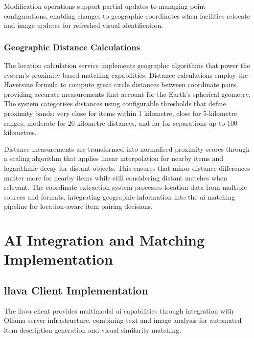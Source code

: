 Modification operations support partial updates to managing point configurations, enabling changes to geographic coordinates when facilities relocate and image updates for refreshed visual identification.

\subsubsection{Geographic Distance Calculations}

The location calculation service implements geographic algorithms that power the system's proximity-based matching capabilities. Distance calculations employ the Haversine formula \cite{Sinnott1984} to compute great circle distances between coordinate pairs, providing accurate measurements that account for the Earth's spherical geometry. The system categorises distances using configurable thresholds that define proximity bands: very close for items within 1 kilometre, close for 5-kilometre ranges, moderate for 20-kilometre distances, and far for separations up to 100 kilometres.

Distance measurements are transformed into normalised proximity scores through a scaling algorithm that applies linear interpolation for nearby items and logarithmic decay for distant objects. This ensures that minor distance differences matter more for nearby items while still considering distant matches when relevant. The coordinate extraction system processes location data from multiple sources and formats, integrating geographic information into the \ac{ai} matching pipeline for location-aware item pairing decisions.



\section{AI Integration and Matching Implementation} \label{section:ai_integration}

\subsection{\ac{llava} Client Implementation} \label{subsection:llava_client}

The \ac{llava} client provides multimodal \ac{ai} capabilities through integration with Ollama server infrastructure, combining text and image analysis for automated item description generation and visual similarity matching.

